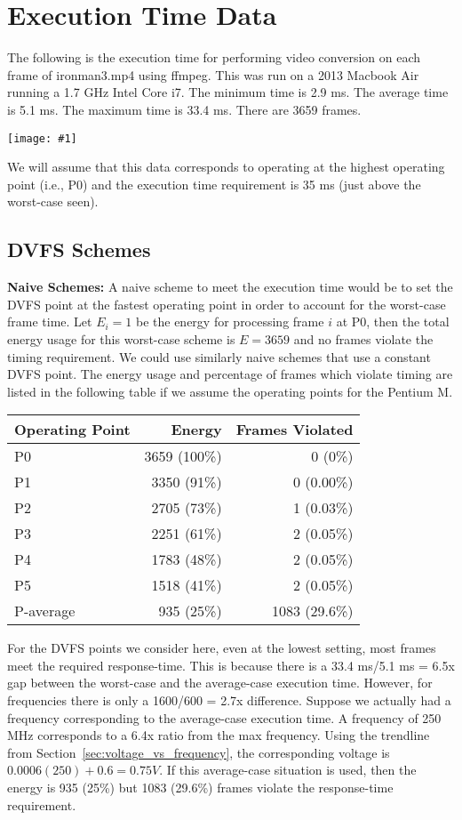 \documentclass[11pt, letterpaper]{article}
\providecommand{\figcol}[1]{
    \noindent
    \begin{center}
      \texttt{[image: \#1]}
    \end{center}
  }
\begin{document}
\section{Execution Time Data}

The following is the execution time for performing video conversion on each
frame of ironman3.mp4 using ffmpeg. This was run on a 2013 Macbook Air running a 1.7 GHz Intel Core i7. The minimum time is 2.9 ms. The average
time is 5.1 ms. The maximum time is 33.4 ms. There are 3659 frames.
\figcol{frame_time.pdf}

We will assume that this data corresponds to operating at the highest operating
point (i.e., P0) and the execution time requirement is 35 ms (just above the
worst-case seen).

\subsection{DVFS Schemes}

\textbf{Naive Schemes: }
A naive scheme to meet the execution time would be to set the DVFS point at the
fastest operating point in order to account for the worst-case frame time. Let
$E_i = 1$ be the energy for processing frame $i$ at P0, then the total energy
usage for this worst-case scheme is $E = 3659$ and no frames violate the timing
requirement. We could use similarly naive schemes that use a constant DVFS
point. The energy usage and percentage of frames which violate timing are
listed in the following table if we assume the operating points for the Pentium M.

\begin{tabular}{|l|r|r|}
\hline
Operating Point & Energy & Frames Violated \\ \hline\hline
P0 & 3659 (100\%) & 0 (0\%) \\ \hline
P1 & 3350 (91\%) & 0 (0.00\%) \\ \hline
P2 & 2705 (73\%) & 1 (0.03\%) \\ \hline
P3 & 2251 (61\%) & 2 (0.05\%) \\ \hline
P4 & 1783 (48\%) & 2 (0.05\%) \\ \hline
P5 & 1518 (41\%) & 2 (0.05\%) \\ \hline
P-average & 935 (25\%) & 1083 (29.6\%) \\ \hline
\end{tabular}

For the DVFS points we consider here, even at the lowest setting, most frames meet the required response-time.
This is because there is a 33.4 ms/5.1 ms = 6.5x gap between the worst-case and
the average-case execution time. However, for frequencies there is only a
1600/600 = 2.7x difference. Suppose we actually had a frequency corresponding
to the average-case execution time. A frequency of 250 MHz corresponds to a
6.4x ratio from the max frequency. Using the trendline from
Section~\ref{sec:voltage_vs_frequency}, the corresponding voltage is
$0.0006(250) + 0.6 = 0.75 V$. If this average-case situation is used, then the
energy is 935 (25\%) but 1083 (29.6\%) frames violate the response-time
requirement.
\end{document}
